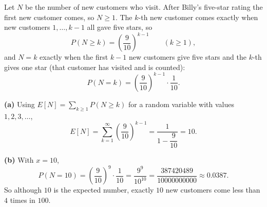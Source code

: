 Let $N$ be the number of new customers who visit. After Billy's five-star rating the first new customer comes, so $N\ge1$. The $k$-th new customer comes exactly when new customers $1,\dots,k-1$ all gave five stars, so
\[P(N\ge k)=\left(\dfrac{9}{10}\right)^{k-1}\qquad(k\ge1),\]
and $N=k$ exactly when the first $k-1$ new customers give five stars and the $k$-th gives one star (that customer has visited and is counted):
\[P(N=k)=\left(\dfrac{9}{10}\right)^{k-1}\cdot\dfrac{1}{10}.\]

\textbf{(a)} Using $E[N]=\displaystyle\sum_{k\ge1}P(N\ge k)$ for a random variable with values $1,2,3,\dots$,
\[E[N]=\sum_{k=1}^{\infty}\left(\dfrac{9}{10}\right)^{k-1}=\dfrac{1}{1-\dfrac{9}{10}}=\boxed{10}.\]

\textbf{(b)} With $x=10$,
\[P(N=10)=\left(\dfrac{9}{10}\right)^{9}\cdot\dfrac{1}{10}=\boxed{\dfrac{9^9}{10^{10}}=\dfrac{387420489}{10000000000}}\approx0.0387.\]
So although $10$ is the expected number, exactly $10$ new customers come less than $4$ times in $100$.
